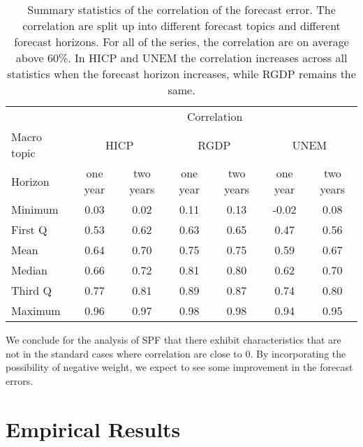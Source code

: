 \documentclass[11pt]{article}
\begin{document}
\begin{table}[!h]
	\centering
	\caption{Summary statistics of the correlation of the forecast error. The correlation are split up into different forecast topics and different forecast horizons. For all of the series, the correlation are on average above 60\%. In HICP and UNEM the correlation increases across all statistics when the forecast horizon increases, while RGDP remains the same.}
	\label{tab: correlation summary statistics}
	\begin{tabular}{lcccccc}%
		\hline
		&\multicolumn{6}{c}{Correlation}\\
		\cmidrule(lr){2-7}
		Macro topic & \multicolumn{2}{c}{HICP} & \multicolumn{2}{c}{RGDP} & \multicolumn{2}{c}{UNEM} \\
		\cmidrule(lr){2-3} \cmidrule(lr){4-5}\cmidrule(lr){6-7}
		Horizon     & one year & two years & one year & two years & one year & two years \\ 
		\hline
		Minimum     & 0.03        & 0.02        & 0.11        & 0.13        & -0.02        & 0.08       \\
		First Q     & 0.53        & 0.62        & 0.63        & 0.65        & 0.47         & 0.56       \\
		Mean        & 0.64        & 0.70        & 0.75        & 0.75        & 0.59         & 0.67       \\
		Median      & 0.66        & 0.72        & 0.81        & 0.80        & 0.62         & 0.70       \\
		Third Q     & 0.77        & 0.81        & 0.89        & 0.87        & 0.74         & 0.80       \\
		Maximum     & 0.96        & 0.97        & 0.98        & 0.98        & 0.94         & 0.95       \\ 
		\hline
	\end{tabular}
\end{table}


We conclude for the analysis of SPF that there exhibit characteristics that are not in the standard cases where correlation are close to 0. By incorporating the possibility of negative weight, we expect to see some improvement in the forecast errors.

\section{Empirical Results}\label{empirical-results}
\end{document}
